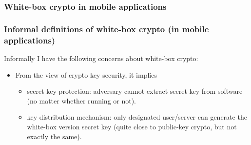 \documentclass{beamer}
\begin{document}
\frame
{
\frametitle{White-box crypto in mobile applications}
\begin{center}
\end{center}

}

\frame
{
\frametitle{Informal definitions of white-box crypto (in mobile applications)}
Informally I have the following concerns about white-box crypto:
\begin{itemize}
\setlength{\itemsep}{12pt}
\item From the view of crypto key security, it implies
\begin{itemize}
\setlength{\itemsep}{12pt}
\item secret key protection: adversary cannot extract secret key from software (no matter whether running or not).

\item key distribution mechanism: only designated user/server can generate the white-box version secret key (quite close to public-key crypto, but not exactly the same).

\end{itemize}
\end{itemize}
}
\end{document}
